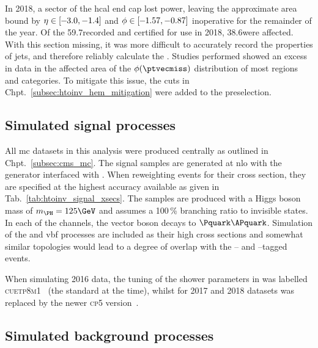 In 2018, a sector of the \acrshort{hcal} end cap lost power, leaving the approximate area bound by $\eta \in \text{[}\mkern-5mu - \mkern-5mu \text{3.0}, -\text{1.4]}$ and $\phi \in \text{[} \mkern-5mu - \mkern-5mu \text{1.57}, -\text{0.87]}$ inoperative for the remainder of the year. Of the 59.7\fbinv recorded and certified for use in 2018, 38.6\fbinv were affected. With this section missing, it was more difficult to accurately record the properties of \glspl{jet}, and therefore reliably calculate the \ptvecmiss. Studies performed showed an excess in data in the affected area of the $\phi(\ptvecmiss)$ distribution of most regions and categories. To mitigate this issue, the cuts in Chpt.~\ref{subsec:htoinv_hem_mitigation} were added to the preselection.




\subsection{Simulated signal processes}
\label{subsec:htoinv_signal}

All \acrlong{mc} datasets in this analysis were produced centrally as outlined in Chpt.~\ref{subsec:cms_mc}. The signal samples are generated at \acrshort{nlo} with the \POWHEG generator interfaced with \PYTHIAEIGHT. When reweighting events for their cross section, they are specified at the highest accuracy available as given in Tab.~\ref{tab:htoinv_signal_xsecs}. The samples are produced with a Higgs boson mass of $m_{\PH} = \text{125}\GeV$ and assumes a 100\,\% branching ratio to invisible states. In each of the \VH channels, the vector boson decays to $\Pquark\APquark$. Simulation of the \ggH and \acrshort{vbf} processes are included as their high cross sections and somewhat similar topologies would lead to a degree of overlap with the \ttH-- and \VH--tagged events.

When simulating 2016 data, the tuning of the shower parameters in \PYTHIA was labelled \textsc{cuetp8m1}~\cite{Khachatryan:2015pea} (the standard at the time), whilst for 2017 and 2018 datasets was replaced by the newer \textsc{cp5} version~\cite{Sirunyan:2019dfx}.




\subsection{Simulated background processes}
\label{subsec:htoinv_background}

